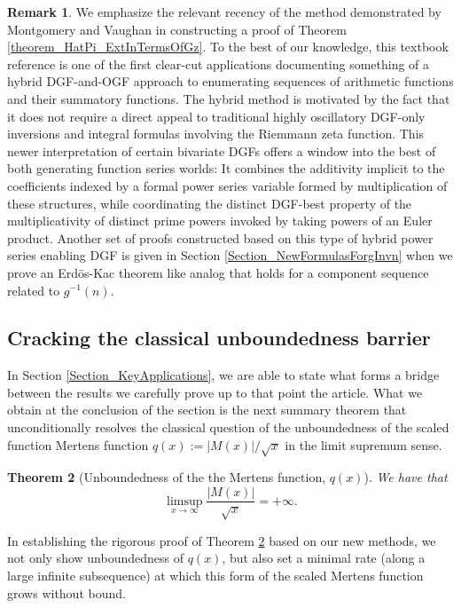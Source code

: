 \documentclass[11pt,reqno,a4letter]{article}
\numberwithin{figure}{section}
\numberwithin{table}{section}
\theoremstyle{plain}
\newtheorem{theorem}{Theorem}
\numberwithin{theorem}{section}
\theoremstyle{definition}
\newtheorem{remark}[theorem]{Remark}
\begin{document}
\begin{remark} 
We emphasize the relevant recency of the method demonstrated by 
Montgomery and Vaughan in constructing a proof of 
Theorem \ref{theorem_HatPi_ExtInTermsOfGz}. 
To the best of our knowledge, this textbook reference is 
one of the first clear-cut applications documenting something of a hybrid 
DGF-and-OGF approach to enumerating sequences of arithmetic functions 
and their summatory functions. The hybrid method is motivated by the fact that it 
does not require a direct appeal to 
traditional highly oscillatory DGF-only inversions and integral formulas 
involving the Riemmann zeta function. 
This newer interpretation of certain bivariate DGFs 
offers a window into the best of both generating function series worlds: 
It combines the additivity 
implicit to the coefficients indexed by a formal power series variable formed by 
multiplication of these structures, while coordinating the distinct DGF-best 
property of the multiplicativity of distinct prime powers invoked 
by taking powers of an Euler product. 
Another set of proofs constructed based on this type of hybrid power series enabling 
DGF is given in Section \ref{Section_NewFormulasForgInvn} 
when we prove an Erd\"os-Kac theorem like analog 
that holds for a component sequence related to $g^{-1}(n)$. 
\end{remark} 

\subsection{Cracking the classical unboundedness barrier} 

In Section \ref{Section_KeyApplications}, 
we are able to state what forms a bridge between the results 
we carefully prove up to that point the article. 
What we obtain at the conclusion of the section 
is the next summary theorem that unconditionally 
resolves the classical question of the 
unboundedness of the scaled function Mertens function 
$q(x) := |M(x)| / \sqrt{x}$ in the limit supremum sense. 

\begin{theorem}[Unboundedness of the the Mertens function, $q(x)$] 
\label{cor_ThePipeDreamResult_v1} 
We have that 
\[
\limsup_{x \rightarrow \infty} \frac{|M(x)|}{\sqrt{x}} = +\infty. 
\]
\end{theorem} 

In establishing the rigorous proof of 
Theorem \ref{cor_ThePipeDreamResult_v1} 
based on our new methods, we not only show unboundedness of 
$q(x)$, but also set a minimal rate (along a large infinite subsequence) 
at which this form of the 
scaled Mertens function grows without bound. 
\end{document}
